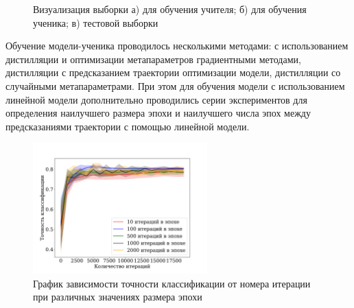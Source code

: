 \documentclass[12pt, twoside]{article}
\begin{document}
\begin{figure}[!ht]
\begin{minipage}[h]{0.5\linewidth}
\end{minipage}
\caption{Визуализация выборки а) для обучения учителя; б) для обучения ученика; в) тестовой выборки}
\label{fig:synt_data}
\end{figure}


Обучение модели-ученика проводилось несколькими методами: с использованием дистилляции и оптимизации метапараметров градиентными методами, дистилляции с предсказанием траектории оптимизации модели, дистилляции со случайными метапараметрами. При этом для обучения модели с использованием линейной модели дополнительно проводились серии экспериментов для определения наилучшего размера эпохи и наилучшего числа эпох между предсказаниями траектории с помощью линейной модели.

\begin{figure}[!ht]
\centering
\includegraphics[width=0.6\textwidth]{linear_epoch_size.pdf}
\caption{График зависимости точности классификации от номера итерации при различных значениях размера эпохи}
\label{fig:epoch_size}
\end{figure}
\end{document}
